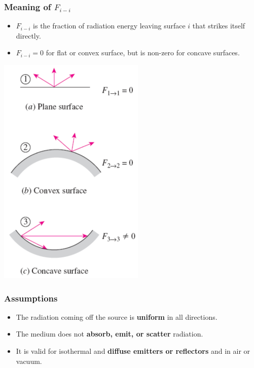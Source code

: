 \documentclass[11pt]{article}
\begin{document}
\subsubsection{Meaning of \(F_{i-i}\)}
\label{sec:org679ab51}
\begin{itemize}
\item \(F_{i-i}\) is the fraction of radiation energy leaving surface \(i\) that strikes itself directly.
\item \(F_{i-i} = 0\) for flat or convex surface, but is non-zero for concave surfaces.
\end{itemize}

\begin{center}
\includegraphics[height=30em]{./images/view-factor-for-surface-striking-itself.png}
\end{center}
\subsubsection{Assumptions}
\label{sec:orgb866cee}
\begin{itemize}
\item The radiation coming off the source is \textbf{uniform} in all directions.
\item The medium does not \textbf{absorb, emit, or scatter} radiation.
\item It is valid for isothermal and \textbf{diffuse emitters or reflectors} and in air or vacuum.
\end{itemize}
\end{document}
